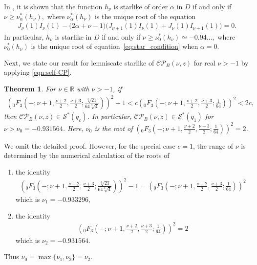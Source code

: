 \documentclass[a4paper,11pt,reqno]{amsart}
\newtheorem{theorem}{Theorem}[section]
\begin{document}
In \cite{Baricz-CP-Bessel}, it is shown that the function $h_{\nu}$ is starlike of order $\alpha$ in $D$ if and only if 
$
\nu \geq \nu_{\alpha}^{*}(h_{\nu}),
$
where $\nu_{\alpha}^{*}(h_{\nu})$ is the unique root of the equation
\begin{align} \label{eq:star_condition}
J_{\nu}(1) I_{\nu}(1) - \big( 2\alpha + \nu - 1 \big) \big( J_{\nu+1}(1) I_{\nu}(1) + J_{\nu}(1) I_{\nu+1}(1) \big) = 0.
\end{align}
In particular, $h_{\nu}$ is starlike in $D$ if and only if 
$
\nu \geq \nu_{0}^{*}(h_{\nu}) \simeq -0.94\ldots,
$
where $\nu_{0}^{*}(h_{\nu})$ is the unique root of equation~\eqref{eq:star_condition} when $\alpha = 0$. 





Next,  we state our result for lemniscate starlike of $\mathcal{CP}_{B}(\nu, z)$  for real $\nu>-1$ by applying \eqref{eqn:self-CP}. 
\begin{theorem}
    For $\nu \in \mathbb{R}$ with $\nu>-1$, if 
\begin{align}
   \left( {}_0F_{3}\left(- ; \nu+1, \tfrac{\nu+2}{2}, \tfrac{\nu+3}{2};  \tfrac{\sqrt[3]{21}}{64 \sqrt[3]{4} }\right)\right)^2 -1< c \left( {}_0F_{3}\left(- ; \nu+1, \tfrac{\nu+2}{2}, \tfrac{\nu+3}{2};  \tfrac{1}{64}\right)\right)^2< 2 c,
\end{align}
then $\mathcal{CP}_{B}(\nu, z) \in \mathcal{S}^{\ast}(q_c)$. In particular, $\mathcal{CP}_{B}(\nu, z) \in \mathcal{S}^{\ast}(q_1)$ for $\nu > \nu_0 = - 0.931564$.  
Here, $\nu_0$ is the root of  $\left( {}_0F_{3}\left(- ; \nu+1, \tfrac{\nu+2}{2}, \tfrac{\nu+3}{2};  \tfrac{1}{64}\right)\right)^2=2$.   
\end{theorem}
We omit the detailed proof. However, for the special case $c=1$, the range of $\nu$ is determined by the numerical calculation of the roots of
\begin{enumerate}
    \item[(i)] the identity
    \begin{align}
   \left( {}_0F_{3}\left(- ; \nu+1, \tfrac{\nu+2}{2}, \tfrac{\nu+3}{2};  \tfrac{\sqrt[3]{21}}{64 \sqrt[3]{4} }\right)\right)^2 -1=  \left( {}_0F_{3}\left(- ; \nu+1, \tfrac{\nu+2}{2}, \tfrac{\nu+3}{2};  \tfrac{1}{64}\right)\right)^2
\end{align}
which is $\nu_1= -0.933296$,
\item[(ii)] the identity 
\begin{align}
 \left( {}_0F_{3}\left(- ; \nu+1, \tfrac{\nu+2}{2}, \tfrac{\nu+3}{2};  \tfrac{1}{64}\right)\right)^2= 2 
\end{align}
which is $\nu_2= -0.931564$.
\end{enumerate}
Thus $\nu_0= \max\{\nu_1, \nu_2\}=\nu_2$. 
\end{document}
